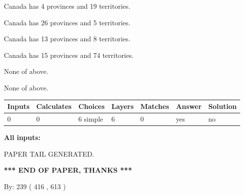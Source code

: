 \documentclass[12pt]{article}
\begin{document}
 
Canada has   4 provinces and  19 territories.
 
 
Canada has  26 provinces and  5 territories.
 
 
Canada has  13 provinces and  8 territories.
 
 
Canada has  15 provinces and  74 territories.
 
 
 None of above.
 
 
\noindent{}
 
 
 None of above.
 
 
\noindent{}
 
 
   
   
   
   
\noindent\begin{tabular}{|l|l|l|l|l|l|l|}
 \hline
Inputs & Calculates & Choices & Layers & Matches & Answer & Solution \\ \hline
 0  & 
 0  & 
 6
  simple  
  & 
 6  & 
 0  & 
  yes & 
  no 
  \\ \hline
 \end{tabular}
   
   
   
   
\noindent{}
   
   
   
   
\noindent\vspace{0.1in}\hspace{-0.08in} {\textbf{\Large{All inputs: }}}
   
   
   
   
   
   
 \vspace{0.2in}
 
   
   
\vspace{2.0in} PAPER TAIL GENERATED.
   
   
   
   
\vspace{1.0in} 
{\textbf{\large{ *** END OF PAPER, THANKS *** }}} 
   
   
\hspace{1.0in} By: 
 239 ( 416 ,  613 )
   
\end{document}
